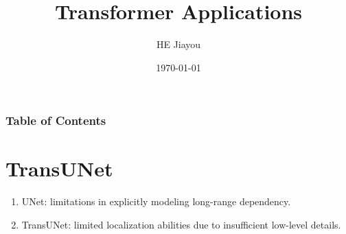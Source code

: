 \documentclass[]{beamer}
\title[]{Transformer Applications}
\author{HE Jiayou}
\date{\today}
\begin{document}
\frame{\titlepage}

\begin{frame}
    \frametitle{Table of Contents}
    \tableofcontents[subsectionstyle=hide, subsubsectionstyle=hide]
\end{frame}

\section{TransUNet}
\begin{frame}
    \begin{enumerate}[label = \arabic*]
        \item UNet: limitations in explicitly modeling long-range dependency.
        \item TransUNet: limited localization abilities due to insufficient low-level details.
    \end{enumerate}
\end{frame}

\begin{frame}
    \printbibliography{}
\end{frame}
\end{document}
